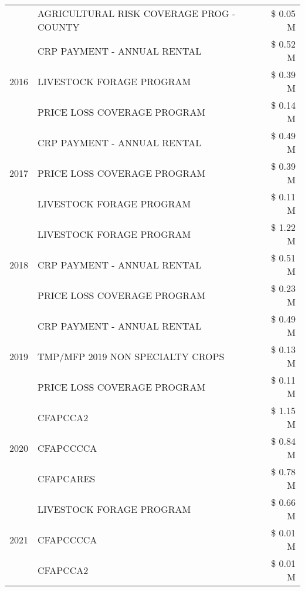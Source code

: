 \begin{tabular}{llr}
 & AGRICULTURAL RISK COVERAGE PROG - COUNTY & \$ 0.05 M \\
\cline{1-3}
\multirow[t]{3}{*}{2016} & CRP PAYMENT - ANNUAL RENTAL & \$ 0.52 M \\
 & LIVESTOCK FORAGE PROGRAM & \$ 0.39 M \\
 & PRICE LOSS COVERAGE PROGRAM & \$ 0.14 M \\
\cline{1-3}
\multirow[t]{3}{*}{2017} & CRP PAYMENT - ANNUAL RENTAL & \$ 0.49 M \\
 & PRICE LOSS COVERAGE PROGRAM & \$ 0.39 M \\
 & LIVESTOCK FORAGE PROGRAM & \$ 0.11 M \\
\cline{1-3}
\multirow[t]{3}{*}{2018} & LIVESTOCK FORAGE PROGRAM & \$ 1.22 M \\
 & CRP PAYMENT - ANNUAL RENTAL & \$ 0.51 M \\
 & PRICE LOSS COVERAGE PROGRAM & \$ 0.23 M \\
\cline{1-3}
\multirow[t]{3}{*}{2019} & CRP PAYMENT - ANNUAL RENTAL & \$ 0.49 M \\
 & TMP/MFP 2019 NON SPECIALTY CROPS & \$ 0.13 M \\
 & PRICE LOSS COVERAGE PROGRAM & \$ 0.11 M \\
\cline{1-3}
\multirow[t]{3}{*}{2020} & CFAPCCA2 & \$ 1.15 M \\
 & CFAPCCCCA & \$ 0.84 M \\
 & CFAPCARES & \$ 0.78 M \\
\cline{1-3}
\multirow[t]{3}{*}{2021} & LIVESTOCK FORAGE PROGRAM & \$ 0.66 M \\
 & CFAPCCCCA & \$ 0.01 M \\
 & CFAPCCA2 & \$ 0.01 M \\
\cline{1-3}
\bottomrule
\end{tabular}

